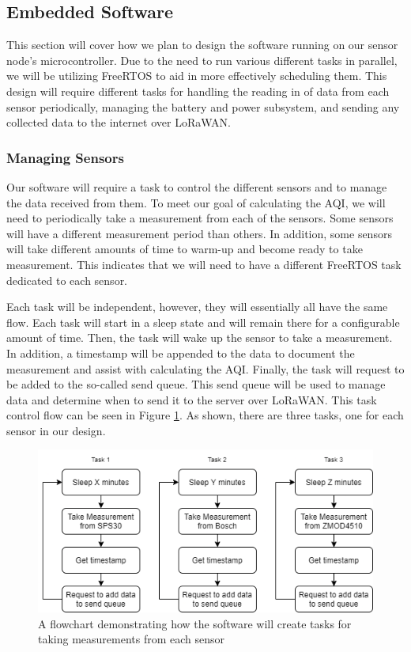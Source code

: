 \subsection{Embedded Software} \label{sec:embedded-software}
This section will cover how we plan to design the software running on our sensor node's microcontroller. Due to the need to run various different tasks in parallel, we will be utilizing FreeRTOS to aid in more effectively scheduling them. This design will require different tasks for handling the reading in of data from each sensor periodically, managing the battery and power subsystem, and sending any collected data to the internet over LoRaWAN.

\subsubsection{Managing Sensors}
Our software will require a task to control the different sensors and to manage the data received from them. To meet our goal of calculating the AQI, we will need to periodically take a measurement from each of the sensors. Some sensors will have a different measurement period than others. In addition, some sensors will take different amounts of time to warm-up and become ready to take measurement. This indicates that we will need to have a different FreeRTOS task dedicated to each sensor.

Each task will be independent, however, they will essentially all have the same flow. Each task will start in a sleep state and will remain there for a configurable amount of time. Then, the task will wake up the sensor to take a measurement. In addition, a timestamp will be appended to the data to document the measurement and assist with calculating the AQI. Finally, the task will request to be added to the so-called send queue. This send queue will be used to manage data and determine when to send it to the server over LoRaWAN. This task control flow can be seen in Figure \ref{fig:measurement-flow}. As shown, there are three tasks, one for each sensor in our design.

\begin{figure}[H]
    \centering
    \includegraphics[width=6in]{figures/measurement-flow.png}
    \caption{A flowchart demonstrating how the software will create tasks for taking measurements from each sensor}
    \label{fig:measurement-flow} 
\end{figure}

